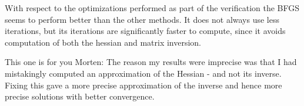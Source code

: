 \documentclass[10pt,oneside,a4paper,final,english]{memoir}
\begin{document}
With respect to the optimizations performed as part of the
verification the BFGS seems to perform better than the other
methods. It does not always use less iterations, but its iterations
are significantly faster to compute, since it avoids computation of
both the hessian and matrix inversion.

This one is for you Morten: The reason my results were imprecise was
that I had mistakingly computed an approximation of the Hessian - and
not its inverse. Fixing this gave a more precise approximation of the
inverse and hence more precise solutions with better convergence.
\end{document}
